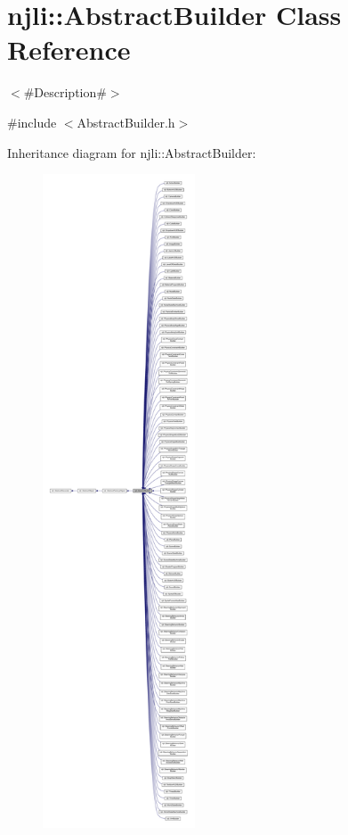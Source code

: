 \hypertarget{classnjli_1_1_abstract_builder}{}\section{njli\+:\+:Abstract\+Builder Class Reference}
\label{classnjli_1_1_abstract_builder}


$<$\#\+Description\#$>$  




{\ttfamily \#include $<$Abstract\+Builder.\+h$>$}



Inheritance diagram for njli\+:\+:Abstract\+Builder\+:\nopagebreak
\begin{figure}[H]
\begin{center}
\leavevmode
\includegraphics[height=550pt]{classnjli_1_1_abstract_builder__inherit__graph}
\end{center}
\end{figure}


